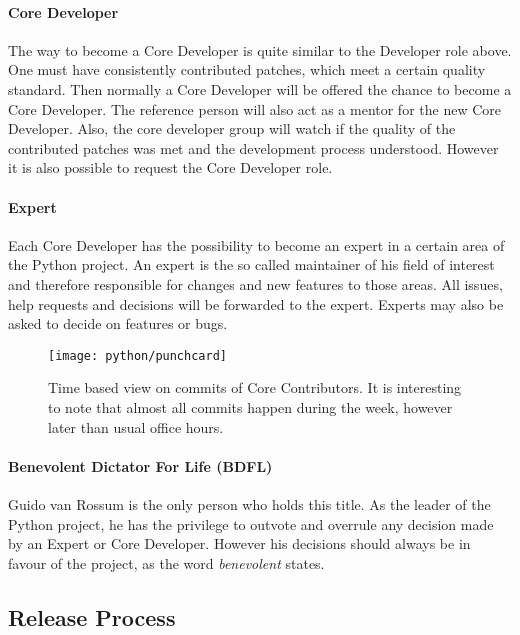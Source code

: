\paragraph{Core Developer}

The way to become a Core Developer is quite similar to the Developer role
above. One must have consistently contributed patches, which meet a certain
quality standard. Then normally a Core Developer will be offered the chance to
become a Core Developer. The reference person will also act as a mentor for the
new Core Developer. Also, the core developer group will watch if the quality of
the contributed patches was met and the development process understood. However
it is also possible to request the Core Developer role.

\paragraph{Expert}

Each Core Developer has the possibility to become an expert in a certain area
of the Python project. An expert is the so called maintainer of his field of
interest and therefore responsible for changes and new features to those areas.
All issues, help requests and decisions will be forwarded to the expert.
Experts may also be asked to decide on features or bugs.

\begin{figure}[hbtp]
  \centering
  \texttt{[image: python/punchcard]}
  \caption[Time based view on commits, Python]
  {Time based view on commits of Core Contributors. It is interesting to note
    that almost all commits happen during the week, however later than usual
    office hours.}
\end{figure}

\paragraph{Benevolent Dictator For Life (BDFL)}

Guido van Rossum is the only person who holds this title. As the leader of the
Python project, he has the privilege to outvote and overrule any decision made
by an Expert or Core Developer. However his decisions should always be in
favour of the project, as the word \emph{benevolent} states.


\subsection{Release Process} %

